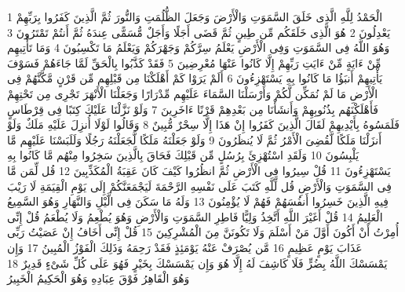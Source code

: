 {\tiny\colorbox{cl_aya}{1}} الْحَمْدُ لِلَّهِ الَّذِى خَلَقَ السَّمَوَتِ وَالْأَرْضَ وَجَعَلَ الظُّلُمَتِ وَالنُّورَ ثُمَّ الَّذِينَ كَفَرُوا بِرَبِّهِمْ يَعْدِلُونَ
{\tiny\colorbox{cl_aya}{2}} هُوَ الَّذِى خَلَقَكُم مِّن طِينٍ ثُمَّ قَضَى أَجَلًا وَأَجَلٌ مُّسَمًّى عِندَهُ ثُمَّ أَنتُمْ تَمْتَرُونَ
{\tiny\colorbox{cl_aya}{3}} وَهُوَ اللَّهُ فِى السَّمَوَتِ وَفِى الْأَرْضِ يَعْلَمُ سِرَّكُمْ وَجَهْرَكُمْ وَيَعْلَمُ مَا تَكْسِبُونَ
{\tiny\colorbox{cl_aya}{4}} وَمَا تَأْتِيهِم مِّنْ ءَايَةٍ مِّنْ ءَايَتِ رَبِّهِمْ إِلَّا كَانُوا عَنْهَا مُعْرِضِينَ
{\tiny\colorbox{cl_aya}{5}} فَقَدْ كَذَّبُوا بِالْحَقِّ لَمَّا جَاءَهُمْ فَسَوْفَ يَأْتِيهِمْ أَنبَؤُا مَا كَانُوا بِهِ يَسْتَهْزِءُونَ
{\tiny\colorbox{cl_aya}{6}} أَلَمْ يَرَوْا كَمْ أَهْلَكْنَا مِن قَبْلِهِم مِّن قَرْنٍ مَّكَّنَّهُمْ فِى الْأَرْضِ مَا لَمْ نُمَكِّن لَّكُمْ وَأَرْسَلْنَا السَّمَاءَ عَلَيْهِم مِّدْرَارًا وَجَعَلْنَا الْأَنْهَرَ تَجْرِى مِن تَحْتِهِمْ فَأَهْلَكْنَهُم بِذُنُوبِهِمْ وَأَنشَأْنَا مِن بَعْدِهِمْ قَرْنًا ءَاخَرِينَ
{\tiny\colorbox{cl_aya}{7}} وَلَوْ نَزَّلْنَا عَلَيْكَ كِتَبًا فِى قِرْطَاسٍ فَلَمَسُوهُ بِأَيْدِيهِمْ لَقَالَ الَّذِينَ كَفَرُوا إِنْ هَذَا إِلَّا سِحْرٌ مُّبِينٌ
{\tiny\colorbox{cl_aya}{8}} وَقَالُوا لَوْلَا أُنزِلَ عَلَيْهِ مَلَكٌ وَلَوْ أَنزَلْنَا مَلَكًا لَّقُضِىَ الْأَمْرُ ثُمَّ لَا يُنظَرُونَ
{\tiny\colorbox{cl_aya}{9}} وَلَوْ جَعَلْنَهُ مَلَكًا لَّجَعَلْنَهُ رَجُلًا وَلَلَبَسْنَا عَلَيْهِم مَّا يَلْبِسُونَ
{\tiny\colorbox{cl_aya}{10}} وَلَقَدِ اسْتُهْزِئَ بِرُسُلٍ مِّن قَبْلِكَ فَحَاقَ بِالَّذِينَ سَخِرُوا مِنْهُم مَّا كَانُوا بِهِ يَسْتَهْزِءُونَ
{\tiny\colorbox{cl_aya}{11}} قُلْ سِيرُوا فِى الْأَرْضِ ثُمَّ انظُرُوا كَيْفَ كَانَ عَقِبَةُ الْمُكَذِّبِينَ
{\tiny\colorbox{cl_aya}{12}} قُل لِّمَن مَّا فِى السَّمَوَتِ وَالْأَرْضِ قُل لِّلَّهِ كَتَبَ عَلَى نَفْسِهِ الرَّحْمَةَ لَيَجْمَعَنَّكُمْ إِلَى يَوْمِ الْقِيَمَةِ لَا رَيْبَ فِيهِ الَّذِينَ خَسِرُوا أَنفُسَهُمْ فَهُمْ لَا يُؤْمِنُونَ
{\tiny\colorbox{cl_aya}{13}} وَلَهُ مَا سَكَنَ فِى الَّيْلِ وَالنَّهَارِ وَهُوَ السَّمِيعُ الْعَلِيمُ
{\tiny\colorbox{cl_aya}{14}} قُلْ أَغَيْرَ اللَّهِ أَتَّخِذُ وَلِيًّا فَاطِرِ السَّمَوَتِ وَالْأَرْضِ وَهُوَ يُطْعِمُ وَلَا يُطْعَمُ قُلْ إِنِّى أُمِرْتُ أَنْ أَكُونَ أَوَّلَ مَنْ أَسْلَمَ وَلَا تَكُونَنَّ مِنَ الْمُشْرِكِينَ
{\tiny\colorbox{cl_aya}{15}} قُلْ إِنِّى أَخَافُ إِنْ عَصَيْتُ رَبِّى عَذَابَ يَوْمٍ عَظِيمٍ
{\tiny\colorbox{cl_aya}{16}} مَّن يُصْرَفْ عَنْهُ يَوْمَئِذٍ فَقَدْ رَحِمَهُ وَذَلِكَ الْفَوْزُ الْمُبِينُ
{\tiny\colorbox{cl_aya}{17}} وَإِن يَمْسَسْكَ اللَّهُ بِضُرٍّ فَلَا كَاشِفَ لَهُ إِلَّا هُوَ وَإِن يَمْسَسْكَ بِخَيْرٍ فَهُوَ عَلَى كُلِّ شَىْءٍ قَدِيرٌ
{\tiny\colorbox{cl_aya}{18}} وَهُوَ الْقَاهِرُ فَوْقَ عِبَادِهِ وَهُوَ الْحَكِيمُ الْخَبِيرُ
